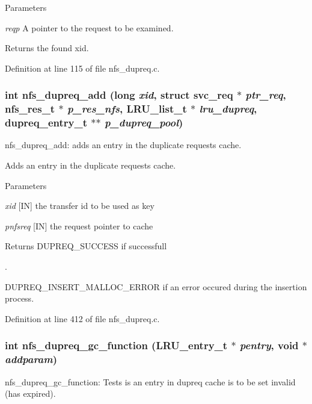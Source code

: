 \begin{DoxyParams}{Parameters}
\item[{\em reqp}]A pointer to the request to be examined.\end{DoxyParams}
\begin{DoxyReturn}{Returns}
the found xid. 
\end{DoxyReturn}


Definition at line 115 of file nfs\_\-dupreq.c.
\subsubsection[{nfs\_\-dupreq\_\-add}]{\setlength{\rightskip}{0pt plus 5cm}int nfs\_\-dupreq\_\-add (long {\em xid}, \/  struct svc\_\-req $\ast$ {\em ptr\_\-req}, \/  nfs\_\-res\_\-t $\ast$ {\em p\_\-res\_\-nfs}, \/  LRU\_\-list\_\-t $\ast$ {\em lru\_\-dupreq}, \/  dupreq\_\-entry\_\-t $\ast$$\ast$ {\em p\_\-dupreq\_\-pool})}\label{nfs__dupreq_8c_a72a8bca40613bd2e5a727a7274ca8e66}
nfs\_\-dupreq\_\-add: adds an entry in the duplicate requests cache.

Adds an entry in the duplicate requests cache.


\begin{DoxyParams}{Parameters}
\item[{\em xid}][IN] the transfer id to be used as key \item[{\em pnfsreq}][IN] the request pointer to cache\end{DoxyParams}
\begin{DoxyReturn}{Returns}
DUPREQ\_\-SUCCESS if successfull\par
. 

DUPREQ\_\-INSERT\_\-MALLOC\_\-ERROR if an error occured during the insertion process. 
\end{DoxyReturn}


Definition at line 412 of file nfs\_\-dupreq.c.
\subsubsection[{nfs\_\-dupreq\_\-gc\_\-function}]{\setlength{\rightskip}{0pt plus 5cm}int nfs\_\-dupreq\_\-gc\_\-function (LRU\_\-entry\_\-t $\ast$ {\em pentry}, \/  void $\ast$ {\em addparam})}\label{nfs__dupreq_8c_a35d644f1f1b2c333ddc223251d615205}
nfs\_\-dupreq\_\-gc\_\-function: Tests is an entry in dupreq cache is to be set invalid (has expired).

